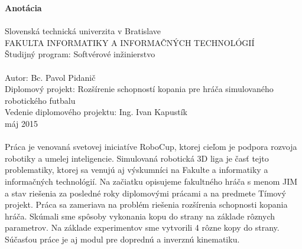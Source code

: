 \begin{titlepage}
\large\textbf{Anotácia}\\\\
\normalsize
Slovenská technická univerzita v Bratislave \\
FAKULTA INFORMATIKY A INFORMAČNÝCH TECHNOLÓGIÍ \\
Študijný program: Softvérové inžinierstvo \\
\\
Autor: Bc. Pavol Pidanič \\
Diplomový projekt: Rozšírenie schopností kopania pre hráča simulovaného robotického futbalu \\
Vedenie diplomového projektu: Ing. Ivan Kapustík \\ 
máj 2015 \\
\\
Práca je venovaná svetovej iniciatíve RoboCup, ktorej cieľom je podpora rozvoja robotiky a umelej inteligencie. Simulovaná robotická 3D liga je časť tejto problematiky, ktorej sa venujú aj výskumníci na Fakulte a informatiky a informačných technológií. Na začiatku opisujeme fakultného hráča s menom JIM a stav riešenia za posledné roky diplomovými prácami a na predmete Tímový projekt. Práca sa zameriava na problém riešenia rozšírenia schopnosti kopania hráča. Skúmali sme spôsoby vykonania kopu do strany na základe rôznych parametrov. Na základe experimentov sme vytvorili 4 rôzne kopy do strany. Súčasťou práce je aj modul pre doprednú a inverznú kinematiku.


\end{titlepage}